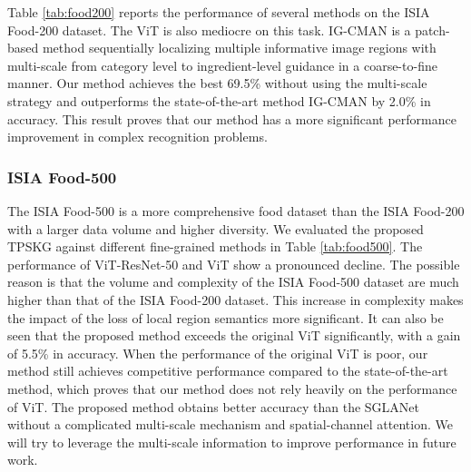 \documentclass[5p,twocolumn]{elsarticle}
\begin{document}
Table \ref{tab:food200} reports the performance of several methods on the ISIA Food-200 dataset.
The ViT is also mediocre on this task. IG-CMAN \cite{Min2019Ingredient} is a patch-based method sequentially localizing multiple informative image regions with multi-scale from category level to ingredient-level guidance in a coarse-to-fine manner. Our method achieves the best 69.5\% without using the multi-scale strategy and outperforms the state-of-the-art method IG-CMAN by 2.0\% in accuracy. This result proves that our method has a more significant performance improvement in complex recognition problems.



\begin{table}[h]
\centering
\caption{Comparison results on ISIA Food-200 dataset.}
\label{tab:food200}
\end{table}




\subsubsection{\textbf{ISIA Food-500}}
The ISIA Food-500 is a more comprehensive food dataset than the ISIA Food-200 with a larger data volume and higher diversity. 
We evaluated the proposed TPSKG against different fine-grained methods in Table \ref{tab:food500}.
The performance of ViT-ResNet-50 and ViT show a pronounced  decline. The possible reason is that the volume and complexity of the ISIA Food-500 dataset are much higher than that of the ISIA Food-200 dataset. This increase in complexity makes the impact of the loss of local region semantics more significant.
It can also be seen that the proposed method exceeds the original ViT significantly, with a gain of 5.5\% in accuracy. When the performance of the original ViT is poor, our method still achieves competitive performance compared to the state-of-the-art method, which proves that our method does not rely heavily on the performance of ViT. 
The proposed method obtains better accuracy than the SGLANet without a complicated multi-scale mechanism and spatial-channel attention. 
We will try to leverage the multi-scale information to improve performance in future work.
\end{document}
